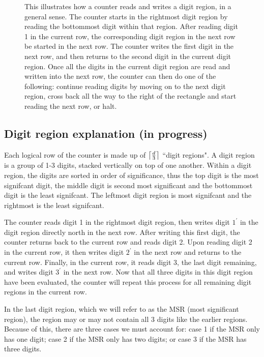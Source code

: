 \begin{figure}[H]\ContinuedFloat
    \caption{\label{fig:counter_read_digit_return_read_digit_general_case3}
    This illustrates how a counter reads and writes a digit region, in a general sense.
    The counter starts in the rightmost digit region by reading the bottommost digit within
    that region. After reading digit 1 in the current row, the corresponding digit region in
    the next row be started in the next row. The counter writes the first digit in the next
    row, and then returns to the second digit in the current digit region.
    Once all the digits in the current digit region are read and written into the next row,
    the counter can then do one of the following: continue reading digits by moving on to the
    next digit region, cross back all the way to the right of the rectangle and start reading
    the next row, or halt.}
\end{figure}

\subsection{Digit region explanation (in progress)}

Each logical row of the counter is made up of $\ceil*{\frac{d}{3}}$ ``digit regions".
%
A digit region is a group of 1-3 digits, stacked vertically on top of one another.
%
Within a digit region, the digits are sorted in order of significance, thus the top digit is the most signifcant digit, the middle digit
is second most significant and the bottommost digit is the least signifcant.
%
The leftmost digit region is most signifcant and the rightmost is the least signifcant.
%

The counter reads digit 1 in the rightmost digit region, then writes digit $1^\prime$ in the digit region directly north in the next row.
%
After writing this first digit, the counter returns back to the current row and reads digit 2.
%
Upon reading digit 2 in the current row, it then writes digit $2^\prime$ in the next row and returns to the current row.
%
Finally, in the current row, it reads digit 3, the last digit remaining, and writes digit $3^\prime$ in the next row.
%
Now that all three digits in this digit region have been evaluated, the counter will repeat this process for all remaining digit regions in the current row.
%

In the last digit region, which we will refer to as the MSR (most significant region), the region may or may not contain all 3 digits like the earlier regions.
%
Because of this, there are three cases we must account for: case 1 if the MSR only has one digit; case 2 if the MSR only has two digits; or case 3 if the MSR has three digits.
%

